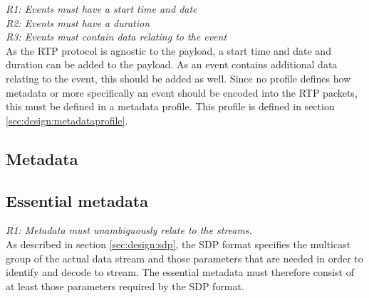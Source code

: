 \noindent \textit{R1: Events must have a start time and date}\\
\textit{R2: Events must have a duration}\\
\textit{R3: Events must contain data relating to the event} \\

\noindent As the RTP protocol is agnostic to the payload, a start time and date and duration can be added to the payload. As an event contains additional data relating to the event, this should be added as well. Since no profile defines how metadata or more specifically an event should be encoded into the RTP packets, this must be defined in a metadata profile. This profile is defined in section \ref{sec:design:metadataprofile}.


\subsection{Metadata} \label{sec:design:metadata}

\subsection{Essential metadata}
\textit{R1: Metadata must unambiguously relate to the streams.}\\
As described in section \ref{sec:design:sdp}, the SDP format specifies the multicast group of the actual data stream and those parameters that are needed in order to identify and decode to  stream.
The essential metadata must therefore consist of at least those parameters required by the SDP format.\\

